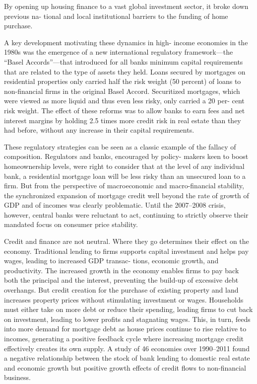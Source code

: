 \documentclass[
]{book}
\begin{document}
By opening up housing
finance to a vast global investment sector, it broke down previous na-
tional and local institutional barriers to the funding of home purchase.

A key development motivating these dynamics in high-­
income
economies in the 1980s was the emergence of a new international
regulatory framework---­the ``Basel Accords''---­that introduced for all
banks minimum capital requirements that are related to the type of
assets they held. Loans secured by mortgages on residential properties
only carried half the risk weight (50 percent) of loans to non-­financial
firms in the original Basel Accord. Securitized mortgages, which were
viewed as more liquid and thus even less risky, only carried a 20 per-
cent risk weight. The effect of these reforms was to allow banks to
earn fees and net interest margins by holding 2.5 times more credit
risk in real estate than they had before, without any increase in their
capital requirements.

These regulatory strategies can be seen as a classic example of the
fallacy of composition. Regulators and banks, encouraged by policy-
makers keen to boost homeownership levels, were right to consider
that at the level of any individual bank, a residential mortgage loan
will be less risky than an unsecured loan to a firm. But from the
perspective of macroeconomic and macro-­financial stability, the synchronized
expansion of mortgage credit well beyond the rate of growth of
GDP and of incomes was clearly problematic. Until the 2007--­2008
crisis, however, central banks were reluctant to act, continuing to strictly
observe their mandated focus on consumer price stability.

Credit and finance are not neutral. Where they go determines their
effect on the economy. Traditional lending to firms supports capital
investment and helps pay wages, leading to increased GDP transac-
tions, economic growth, and productivity. The increased growth in the
economy enables firms to pay back both the principal and the interest,
preventing the build-­up of excessive debt overhangs. But credit
creation for the purchase of existing property and land increases
property prices without stimulating investment or wages.
Households
must either take on more debt or reduce their spending, leading firms
to cut back on investment, leading to lower profits and stagnating
wages. This, in turn, feeds into more demand for mortgage debt as
house prices continue to rise relative to incomes, generating a
positive feedback cycle where increasing mortgage credit effectively
creates its own supply.
A study of 46
economies over 1990--­2011 found a negative relationship between the
stock of bank lending to domestic real estate and economic growth
but positive growth effects of credit flows to non-­financial business.
\end{document}
